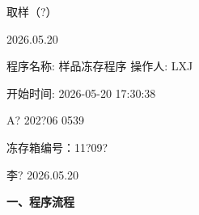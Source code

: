 \documentclass[UTF8,10pt,a4paper,fontset=fandol]{ctexart}
\newcommand{\fieldvalue}[1]{#1}
\newcommand{\handwritten}[1]{#1}
\begin{document}
\handwritten{取样（?）}

\handwritten{2026.05.20}

\bigskip

\noindent
程序名称:
\fieldvalue{样品冻存程序}
\qquad
操作人:
\fieldvalue{LXJ}

\medskip

\noindent
开始时间:
\fieldvalue{2026-05-20 17:30:38}

\handwritten{A? 202?06 0539}

\handwritten{冻存箱编号：11?09?}

\handwritten{李? 2026.05.20}

\medskip

\noindent\textbf{一、程序流程}
\end{document}
